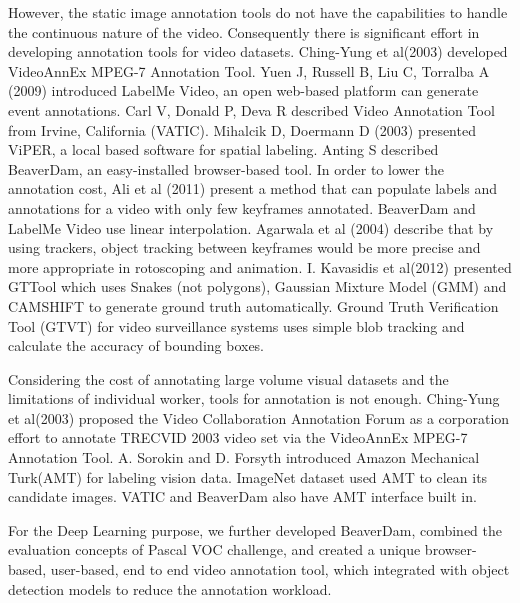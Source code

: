 \documentclass[conference]{IEEEtran}
\begin{document}
However, the static image annotation tools do not have the capabilities to handle the continuous nature of the video. Consequently there is significant effort in developing annotation tools for video datasets. Ching-Yung et al(2003)\cite{lin2003videoann} developed VideoAnnEx MPEG-7 Annotation Tool. Yuen J, Russell B, Liu C, Torralba A (2009)\cite{yuen2009labelmevideo} introduced LabelMe Video, an open web-based platform can generate event annotations. Carl V, Donald P, Deva R\cite{carl2012vatic} described Video Annotation Tool from Irvine, California (VATIC). Mihalcik D, Doermann D (2003) presented ViPER\cite{mihalcik2003viper}, a local based software for spatial labeling. Anting S\cite{shen2016beaverdam} described BeaverDam, an easy-installed browser-based tool. In order to lower the annotation cost, Ali et al (2011)\cite{ali2011flowboost} present a method that can populate labels and annotations for a video with only few keyframes annotated. BeaverDam and LabelMe Video use linear interpolation. Agarwala et al (2004)\cite{agarwala2004tracker} describe that by using trackers, object tracking between keyframes would be more precise and more appropriate in rotoscoping and animation. I. Kavasidis et al(2012)\cite{I2012GTTool} presented GTTool which uses Snakes\cite{kass1988snakes} (not polygons), Gaussian Mixture Model (GMM)\cite{stauffer1999gmm} and CAMSHIFT\cite{bradski1998camshift} to generate ground truth automatically. Ground Truth Verification Tool (GTVT)\cite{ambardekar2009gtvt} for video surveillance systems uses simple blob tracking\cite{gupte2002sblobtrack} and calculate the accuracy of bounding boxes.

Considering the cost of annotating large volume visual datasets and the limitations of individual worker, tools for annotation is not enough. Ching-Yung et al(2003)\cite{lin2003videoann} proposed the Video Collaboration Annotation Forum as a corporation effort to annotate TRECVID\cite{smeaton2006trecvid} 2003 video set via the VideoAnnEx MPEG-7 Annotation Tool. A. Sorokin and D. Forsyth introduced Amazon Mechanical Turk(AMT)\cite{sorokin2008amt} for labeling vision data. ImageNet\cite{deng2009imgnet} dataset used AMT to clean its candidate images. VATIC and BeaverDam also have AMT interface built in. 

For the Deep Learning purpose, we further developed BeaverDam, combined the evaluation concepts of Pascal VOC challenge\cite{everingham2010vocchallenge}, and created a unique browser-based, user-based, end to end video annotation tool, which integrated with object detection models to reduce the annotation workload.
\end{document}
